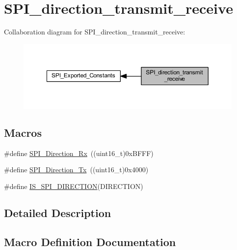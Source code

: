 \hypertarget{group___s_p_i__direction__transmit__receive}{}\section{S\+P\+I\+\_\+direction\+\_\+transmit\+\_\+receive}
\label{group___s_p_i__direction__transmit__receive}
Collaboration diagram for S\+P\+I\+\_\+direction\+\_\+transmit\+\_\+receive\+:
\nopagebreak
\begin{figure}[H]
\begin{center}
\leavevmode
\includegraphics[width=350pt]{group___s_p_i__direction__transmit__receive}
\end{center}
\end{figure}
\subsection*{Macros}
\begin{DoxyCompactItemize}
\item 
\#define \hyperlink{group___s_p_i__direction__transmit__receive_ga9a59d225a8cf42eebafbec6ad95c078c}{S\+P\+I\+\_\+\+Direction\+\_\+\+Rx}~((uint16\+\_\+t)0x\+B\+F\+F\+F)
\item 
\#define \hyperlink{group___s_p_i__direction__transmit__receive_gabd76982a7e305c13f7ad8ea1789d3c0c}{S\+P\+I\+\_\+\+Direction\+\_\+\+Tx}~((uint16\+\_\+t)0x4000)
\item 
\#define \hyperlink{group___s_p_i__direction__transmit__receive_gae96b69403c4206e347cde77b9a30e207}{I\+S\+\_\+\+S\+P\+I\+\_\+\+D\+I\+R\+E\+C\+T\+I\+ON}(D\+I\+R\+E\+C\+T\+I\+ON)
\end{DoxyCompactItemize}


\subsection{Detailed Description}


\subsection{Macro Definition Documentation}
\mbox{\label{group___s_p_i__direction__transmit__receive_gae96b69403c4206e347cde77b9a30e207}} 
